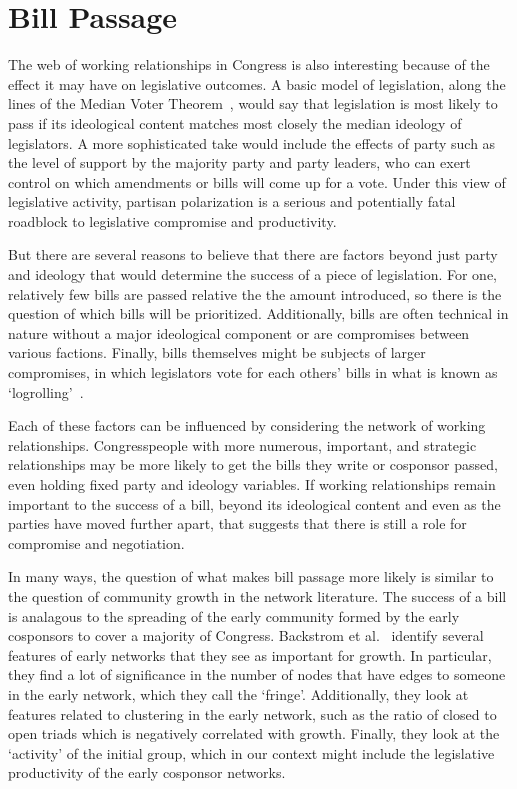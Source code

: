 \section{Bill Passage}

The web of working relationships in Congress is also interesting because of the
effect it may have on legislative outcomes. A basic model of legislation, along
the lines of the Median Voter Theorem~\cite{Black}, would say that legislation
is most likely to pass if its ideological content matches most closely the
median ideology of legislators. A more sophisticated take would include the
effects of party such as the level of support by the majority party and party
leaders, who can exert control on which amendments or bills will come up for a
vote. Under this view of legislative activity, partisan polarization is a
serious and potentially fatal roadblock to legislative compromise and
productivity.

But there are several reasons to believe that there are factors beyond just
party and ideology that would determine the success of a piece of legislation.
For one, relatively few bills are passed relative the the amount introduced, so
there is the question of which bills will be prioritized. Additionally, bills
are often technical in nature without a major ideological component or are
compromises between various factions. Finally, bills themselves might be
subjects of larger compromises, in which legislators vote for each others' bills
in what is known as `logrolling'~\cite{Schwartz}.

Each of these factors can be influenced by considering the network of working
relationships. Congresspeople with more numerous, important, and strategic
relationships may be more likely to get the bills they write or cosponsor
passed, even holding fixed party and ideology variables. If working
relationships remain important to the success of a bill, beyond its ideological
content and even as the parties have moved further apart, that suggests that
there is still a role for compromise and negotiation.

In many ways, the question of what makes bill passage more likely is similar to
the question of community growth in the network literature. The success of a
bill is analagous to the spreading of the early community formed by the early
cosponsors to cover a majority of Congress. Backstrom et al.~\cite{Backstrom}
identify several features of early networks that they see as important for
growth. In particular, they find a lot of significance in the number of nodes
that have edges to someone in the early network, which they call the `fringe'.
Additionally, they look at features related to clustering in the early network,
such as the ratio of closed to open triads which is negatively correlated with
growth. Finally, they look at the `activity' of the initial group, which in our
context might include the legislative productivity of the early cosponsor
networks.

